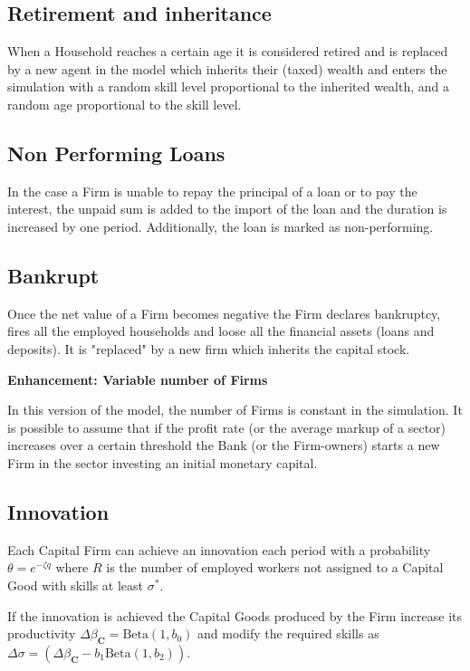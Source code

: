 \documentclass[a4paper, headings=standardclasses]{scrartcl}
\newenvironment{enh}[1][]{\begin{framed}\noindent\textbf{Enhancement: #1}\par}{\end{framed}}
\begin{document}
\subsection{Retirement and inheritance}
When a Household reaches a certain age it is considered retired and is replaced by a new agent in the model which inherits their (taxed) wealth and enters the simulation with a random skill level proportional to the inherited wealth, and a random age proportional to the skill level.

\subsection{Non Performing Loans}
In the case a Firm is unable to repay the principal of a loan or to pay the interest, the unpaid sum is added to the import of the loan and the duration is increased by one period. Additionally, the loan is marked as non-performing.

\subsection{Bankrupt}
Once the net value of a Firm becomes negative the Firm declares bankruptcy, fires all the employed households and loose all the financial assets (loans and deposits). It is "replaced" by a new firm which inherits the capital stock.

\begin{enh}[Variable number of Firms]
	In this version of the model, the number of Firms is constant in the simulation. It is possible to assume that if the profit rate (or the average markup of a sector) increases over a certain threshold the Bank (or the Firm-owners) starts a new Firm in the sector investing an initial monetary capital.
\end{enh}

\subsection{Innovation}
Each Capital Firm can achieve an innovation each period with a probability $\theta = e^{-\zeta q}$ where $R$ is the number of employed workers not assigned to a Capital Good with skills at least $\sigma^*$.

If the innovation is achieved the Capital Goods produced by the Firm increase its productivity $\Delta \beta_\mathbf{C} = \text{Beta}(1, b_0)$ and modify the required skills as $\Delta \sigma = (\Delta \beta_\mathbf{C} - b_1 \text{Beta}(1, b_2))$.
\end{document}
